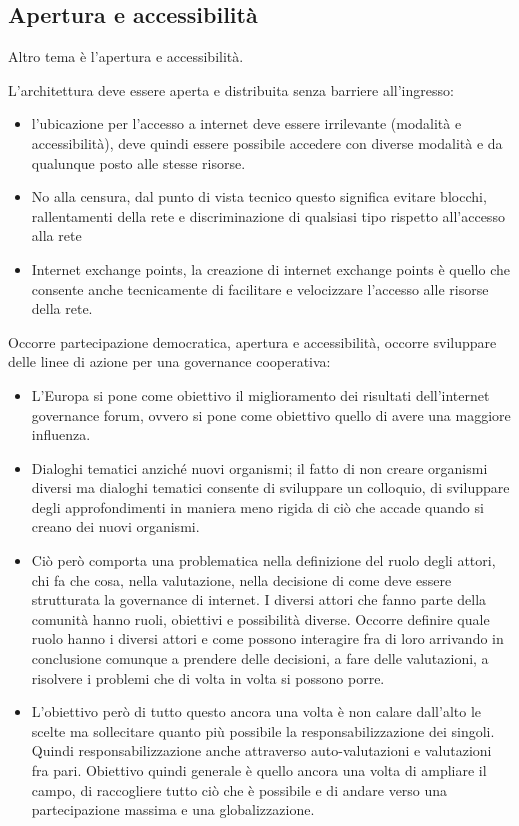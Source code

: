 \subsection{Apertura e accessibilità}

Altro tema è l'apertura e accessibilità.

L'architettura deve essere aperta e distribuita senza barriere all'ingresso:
\begin{itemize}
    \item l'ubicazione per l'accesso a internet deve essere irrilevante (modalità e accessibilità), deve quindi essere possibile accedere con diverse modalità e da qualunque posto alle stesse risorse.
    
    \item No alla censura, dal punto di vista tecnico questo significa evitare blocchi, rallentamenti della rete e discriminazione di qualsiasi tipo rispetto all'accesso alla rete
    
    \item Internet exchange points, la creazione di internet exchange points è quello che consente anche tecnicamente di facilitare e velocizzare l'accesso alle risorse della rete. 
\end{itemize}

Occorre partecipazione democratica, apertura e accessibilità,  occorre sviluppare delle linee di azione per una governance cooperativa:

\begin{itemize}
    \item  L'Europa si pone come obiettivo il miglioramento dei risultati dell'internet governance forum, ovvero si pone come obiettivo quello di avere una maggiore influenza.
    
    \item Dialoghi tematici anziché nuovi organismi; il fatto di non creare organismi diversi ma dialoghi tematici consente di sviluppare un colloquio, di sviluppare degli approfondimenti in maniera meno rigida di ciò che accade quando si creano dei nuovi organismi.
    
    \item Ciò però comporta una problematica nella definizione del ruolo degli attori, chi fa che cosa, nella valutazione, nella decisione di come deve essere strutturata la governance di internet. I diversi attori che fanno parte della comunità hanno ruoli, obiettivi e possibilità diverse. Occorre definire quale ruolo hanno i diversi attori e come possono interagire fra di loro arrivando in conclusione comunque a prendere delle decisioni, a fare delle valutazioni, a risolvere i problemi che di volta in volta si possono porre.
    
    \item L'obiettivo però di tutto questo ancora una volta è non calare dall'alto le scelte ma sollecitare quanto più possibile la responsabilizzazione dei singoli. Quindi responsabilizzazione anche attraverso auto-valutazioni e valutazioni fra pari. Obiettivo quindi generale è quello ancora una volta di ampliare il campo, di raccogliere tutto ciò che è possibile e di andare verso una partecipazione massima e una globalizzazione.
\end{itemize}

